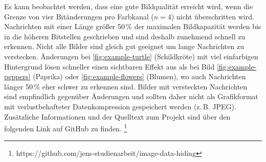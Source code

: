 \newpage



\newpage



\newpage



\newpage

\noindent
Es kann beobachtet werden, dass
eine gute Bildqualität erreicht wird,
wenn die Grenze von vier Bitänderungen pro Farbkanal ($n = 4$) nicht überschritten wird.
Nachrichten mit einer Länge größer 50\,\% der maximalen Bildkapazität werden bis in die höheren
Bitstellen geschrieben und sind deshalb zunehmend schnell zu erkennen.
Nicht alle Bilder sind gleich gut geeignet um lange Nachrichten zu verstecken.
Änderungen bei \ref{fig:example-turtle} (Schildkröte) mit viel einfarbigen Hintergrund
lösen schneller einen sichtbaren Effekt aus als bei Bild \ref{fig:example-peppers}
(Paprika) oder \ref{fig:example-flowers} (Blumen), wo auch Nachrichten länger
50\,\% eher schwer zu erkennen sind. Bilder mit versteckten Nachrichten
sind empfindlich gegenüber Änderungen und sollten daher nicht als
Grafikformat mit verlustbehafteter Datenkompression gespeichert werden (z.\,B. JPEG).
Zusätzliche Informationen und der Quelltext zum Projekt
sind über den folgenden Link auf GitHub zu finden.
\footnote{https://github.com/jens-studienarbeit/image-data-hiding}